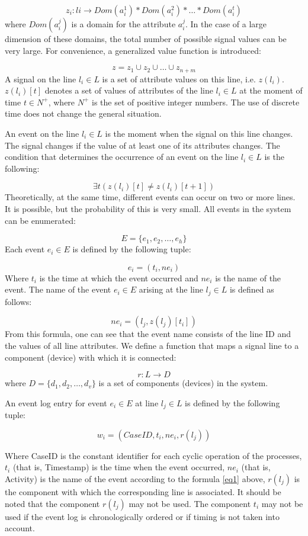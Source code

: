 \begin{bibunit}
\[ z_i: li\rightarrow Dom(a_i^1) * Dom(a_i^2) * \dots * Dom(a_i^t) \]
where $ Dom(a_i^j) $ is a domain for the attribute  $ a_i^j $. 
In the case of a large dimension of these domains, the total number of possible signal values can be very large. For convenience, a generalized value function is introduced: 

\[ z=z_1 \cup z_2 \cup \dots \cup z_{n+m}  \]
A signal on the line $ l_i \in L$ is a set of attribute values on this line, i.e. $z(l_i)$.
$z(l_i)[t]$ denotes a set of values of attributes of the line $ l_i \in L$ at the moment of time $ t \in  N^+ $, where $N^+ $ is the set of positive integer numbers. The use of  discrete time does not change the general situation. 

An event on the line $ l_i \in L$ is the moment when the signal on this line changes. The signal changes if the value of at least one of its attributes changes. The condition that determines the occurrence of an event on the line  $ l_i \in L$ is the following: 


\[ \exists t (z(l_i)[t] \ne z(l_i)[t+1]) \]
Theoretically, at the same time, different events can occur on two or more lines. It is possible, but the probability of this is very small. All events in the system can be enumerated: 


\[ E=\{e_1,e_2,\dots, e_h\} \]
Each event $ e_i \in E  $ is defined by the following tuple:

\[ e_i = (t_i, ne_i) \]
Where $t_i$ is the time at which the event occurred and $ne_i$ is the name of the event. The name of the event $e_i \in E $ arising   at the line $l_j \in L$ is defined as follows:

\begin{equation} \label{eq1}
   ne_i = (l_j,z(l_j)[t_i]) 
\end{equation}   
From this formula, one can see that the event name consists of the line ID and the values of all line attributes. We define a function that maps a signal line to a component (device) with which it is connected: 

\[ r : L \rightarrow D \] 
where $ D=\{d_1,d_2,\dots, d_v\} $ is a set of components (devices) in the system. 

An event log entry for event $ e_i \in E $ at line  $ l_j \in L$ is defined by the following tuple: 

\[  w_i= (CaseID, t_i, ne_i, r(l_j)) \]

Where CaseID is the constant identifier for each cyclic operation of the processes, $t_i$ (that is, Timestamp) is the time when the event occurred, $ne_i$ (that is, Activity) is the name of the event according to the formula \ref{eq1} above, $r(l_j)$ is the component with which the corresponding line is associated.  It should be noted that the component $r(l_j)$ may not be used. The component $t_i$ may not be used if the event log is chronologically ordered or if timing is not taken into account.

\clearpage
\putbib

\end{bibunit}
